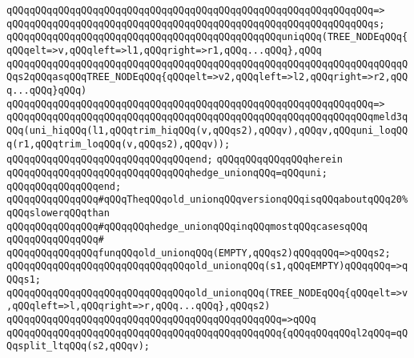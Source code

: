 \verb|qQQqqQQqqQQqqQQqqQQqqQQqqQQqqQQqqQQqqQQqqQQqqQQqqQQqqQQqqQQqqQQq=>|\newline
\verb|qQQqqQQqqQQqqQQqqQQqqQQqqQQqqQQqqQQqqQQqqQQqqQQqqQQqqQQqqQQqqQQqs;|\newline
\newline
\verb|qQQqqQQqqQQqqQQqqQQqqQQqqQQqqQQqqQQqqQQqqQQqqQQquniqQQq(TREE_NODEqQQq{qQQqelt=>v,qQQqleft=>l1,qQQqright=>r1,qQQq...qQQq},qQQq|\newline
\verb|qQQqqQQqqQQqqQQqqQQqqQQqqQQqqQQqqQQqqQQqqQQqqQQqqQQqqQQqqQQqqQQqqQQqqQQqs2qQQqasqQQqTREE_NODEqQQq{qQQqelt=>v2,qQQqleft=>l2,qQQqright=>r2,qQQq...qQQq}qQQq)|\newline
\verb|qQQqqQQqqQQqqQQqqQQqqQQqqQQqqQQqqQQqqQQqqQQqqQQqqQQqqQQqqQQqqQQq=>|\newline
\verb|qQQqqQQqqQQqqQQqqQQqqQQqqQQqqQQqqQQqqQQqqQQqqQQqqQQqqQQqqQQqqQQqmeld3qQQq(uni_hiqQQq(l1,qQQqtrim_hiqQQq(v,qQQqs2),qQQqv),qQQqv,qQQquni_loqQQq(r1,qQQqtrim_loqQQq(v,qQQqs2),qQQqv));|\newline
\verb|qQQqqQQqqQQqqQQqqQQqqQQqqQQqqQQqend;|\newline
\newline
\verb|qQQqqQQqqQQqqQQqherein|\newline
\newline
\verb|qQQqqQQqqQQqqQQqqQQqqQQqqQQqqQQqhedge_unionqQQq=qQQquni;|\newline
\newline
\verb|qQQqqQQqqQQqqQQqend;|\newline
\newline
\verb|qQQqqQQqqQQqqQQq#qQQqTheqQQqold_unionqQQqversionqQQqisqQQqaboutqQQq20%qQQqslowerqQQqthan|\newline
\verb|qQQqqQQqqQQqqQQq#qQQqqQQqhedge_unionqQQqinqQQqmostqQQqcasesqQQq|\newline
\verb|qQQqqQQqqQQqqQQq#|\newline
\verb|qQQqqQQqqQQqqQQqfunqQQqold_unionqQQq(EMPTY,qQQqs2)qQQqqQQq=>qQQqs2;|\newline
\verb|qQQqqQQqqQQqqQQqqQQqqQQqqQQqqQQqold_unionqQQq(s1,qQQqEMPTY)qQQqqQQq=>qQQqs1;|\newline
\newline
\verb|qQQqqQQqqQQqqQQqqQQqqQQqqQQqqQQqold_unionqQQq(TREE_NODEqQQq{qQQqelt=>v,qQQqleft=>l,qQQqright=>r,qQQq...qQQq},qQQqs2)|\newline
\verb|qQQqqQQqqQQqqQQqqQQqqQQqqQQqqQQqqQQqqQQqqQQqqQQq=>qQQq|\newline
\verb|qQQqqQQqqQQqqQQqqQQqqQQqqQQqqQQqqQQqqQQqqQQqqQQq{qQQqqQQqqQQql2qQQq=qQQqsplit_ltqQQq(s2,qQQqv);|\newline
